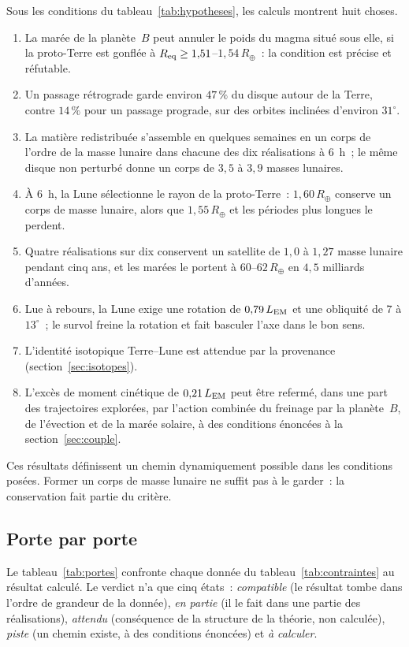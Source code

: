 \documentclass[11pt,a4paper]{article}
\newcommand{\Rt}{\ensuremath{R_\oplus}}
\newcommand{\LEM}{\ensuremath{L_{\rm EM}}}
\newcommand{\Req}{\ensuremath{R_{\rm eq}}}
\begin{document}
Sous les conditions du tableau~\ref{tab:hypotheses}, les calculs montrent huit choses.
\begin{enumerate}[leftmargin=1.6em,itemsep=2pt]
\item La marée de la planète~$B$ peut annuler le poids du magma situé sous elle, si la proto-Terre est gonflée à $\Req\ge1{,}51$--$1{,}54\,\Rt$~: la condition est précise et réfutable.
\item Un passage rétrograde garde environ $47\,\%$ du disque autour de la Terre, contre $14\,\%$ pour un passage prograde, sur des orbites inclinées d'environ $31^\circ$.
\item La matière redistribuée s'assemble en quelques semaines en un corps de l'ordre de la masse lunaire dans chacune des dix réalisations à $6$~h~; le même disque non perturbé donne un corps de $3{,}5$ à $3{,}9$ masses lunaires.
\item À $6$~h, la Lune sélectionne le rayon de la proto-Terre~: $1{,}60\,\Rt$ conserve un corps de masse lunaire, alors que $1{,}55\,\Rt$ et les périodes plus longues le perdent.
\item Quatre réalisations sur dix conservent un satellite de $1{,}0$ à $1{,}27$ masse lunaire pendant cinq ans, et les marées le portent à $60$--$62\,\Rt$ en $4{,}5$ milliards d'années.
\item Lue à rebours, la Lune exige une rotation de $0{,}79\,\LEM$ et une obliquité de $7$ à $13^\circ$~; le survol freine la rotation et fait basculer l'axe dans le bon sens.
\item L'identité isotopique Terre--Lune est attendue par la provenance (section~\ref{sec:isotopes}).
\item L'excès de moment cinétique de $0{,}21\,\LEM$ peut être refermé, dans une part des trajectoires explorées, par l'action combinée du freinage par la planète~$B$, de l'évection et de la marée solaire, à des conditions énoncées à la section~\ref{sec:couple}.
\end{enumerate}
Ces résultats définissent un chemin dynamiquement possible dans les conditions posées. Former un corps de masse lunaire ne suffit pas à le garder~: la conservation fait partie du critère.

\subsection{Porte par porte}
\label{sec:portes}

Le tableau~\ref{tab:portes} confronte chaque donnée du tableau~\ref{tab:contraintes} au résultat calculé. Le verdict n'a que cinq états~: \emph{compatible} (le résultat tombe dans l'ordre de grandeur de la donnée), \emph{en partie} (il le fait dans une partie des réalisations), \emph{attendu} (conséquence de la structure de la théorie, non calculée), \emph{piste} (un chemin existe, à des conditions énoncées) et \emph{à calculer}.
\end{document}
